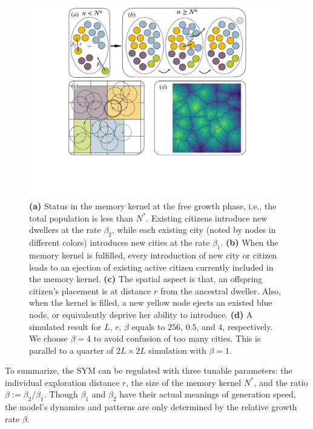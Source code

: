 \documentclass[reprint,unsortedaddress,amsmath,amssymb,aps,prl,showkeys]{revtex4-2}
\begin{document}
\begin{figure}
	\centering
	\includegraphics[width = 0.95\linewidth]{pics/sketchgood.pdf}
	\caption{\textbf{(a)} Status in the memory kernel at the free growth phase, i.e., the total population is less than $N^*$. Existing citizens introduce new dwellers at the rate $\beta_2$, while each existing city (noted by nodes in different colors) introduces new cities at the rate $\beta_1$. \textbf{(b)} When the memory kernel is fulfilled, every introduction of new city or citizen leads to an ejection of existing active citizen currently included in the memory kernel. \textbf{(c)} The spatial aspect is that, an offspring citizen's placement is at distance $r$ from the ancestral dweller. Also, when the kernel is filled, a new yellow node ejects an existed blue node, or equivalently deprive her ability to introduce. \textbf{(d)} A simulated result for $L$, $r$, $\beta$ equals to $256$, $0.5$, and $4$, respectively. We choose $\beta = 4$ to avoid confusion of too many cities. This is parallel to a quarter of $2L\times 2L$ simulation with $\beta = 1$.}
	\label{sketchpic}
\end{figure}

To summarize, the SYM can be regulated with three tunable parameters: the individual exploration distance $r$, the size of the memory kernel $N^*$, and the ratio $\beta:=\beta_2/\beta_1$. Though $\beta_1$ and $\beta_2$ have their actual meanings of generation speed, the model's dynamics and patterns are only determined by the relative growth rate $\beta$.
\end{document}
